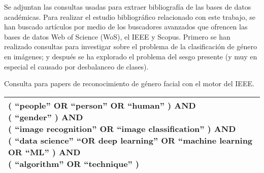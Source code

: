 Se adjuntan las consultas usadas para extraer bibliografía de las bases de datos académicas.
Para realizar el estudio bibliográfico relacionado con este trabajo, se han buscado artículos por medio de los buscadores avanzados que ofrencen las bases de datos Web of Science (WoS), el IEEE y Scopus. Primero se han realizado consultas para investigar sobre el problema de la clasificación de género en imágenes; y después se ha explorado el problema del sesgo presente (y muy en especial el causado por desbalanceo de clases).

\begin{table}[Consulta género - IEEE]{}{Consulta para papers de reconocimiento de género facial con el motor del IEEE.}
    \small
    \begin{tabular}{|l|}
    \hline
        \makecell[l]{( ``people'' OR ``person'' OR ``human'' ) AND \\
        ( ``gender'' ) AND \\
        ( ``image recognition'' OR ``image classification'' ) AND \\
        ( ``data science'' ``OR deep learning'' OR ``machine learning OR ``ML'' ) AND \\
        ( ``algorithm'' OR ``technique'' )} \\
    \hline
    \end{tabular}
\end{table}

